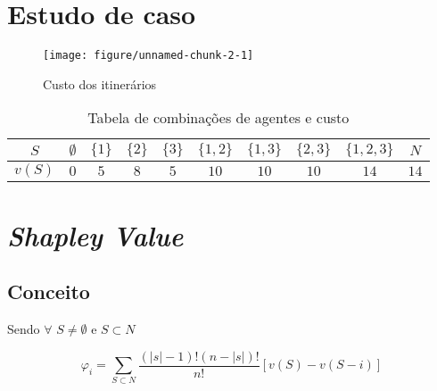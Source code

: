 \documentclass[
	article,			        %
	11pt,				          %
	oneside,			        %
	a4paper,			        %
	english,			        %
	brazil,				        %
	sumario=tradicional
]{abntex2}\usepackage[]{graphicx}\usepackage[]{color}
\makeatletter
\def\maxwidth{ %
  \ifdim\Gin@nat@width>\linewidth
    \linewidth
  \else
    \Gin@nat@width
  \fi
}
\newenvironment{knitrout}{}{} %
\makeatother
\begin{document}
\section{Estudo de caso}
\label{sec:caso}

\begin{knitrout}
\color{fgcolor}\begin{figure}[H]

{\centering \texttt{[image: figure/unnamed-chunk-2-1]} 

}

\caption[Custo dos itinerários]{Custo dos itinerários}\label{fig:unnamed-chunk-2}
\end{figure}


\end{knitrout}

\begin{table}[!h]
  \centering
  \caption{Tabela de combinações de agentes e custo}
  \label{Tab1}
  \begin{tabular}{@{}cccccccccc@{}}
  \toprule
    $S$    & $\emptyset$ & $\{1\}$ & $\{2\}$ & $\{3\}$ & $\{1,2\}$ & $\{1,3\}$ & $\{2,3\}$ &     $\{1,2,3\}$ & $N$  \\ \midrule
    $v(S)$ & $0$         & $5$     & $8$     & $5$     & $10$      & $10$      & $10$      &     $14$        & $14$ \\ \bottomrule
  \end{tabular}
\end{table}

\section{\emph{Shapley Value}}
\label{sec:teoria}

\subsection{Conceito}

Sendo $\forall$ $S \neq \emptyset$ e $S \subset N$

\begin{equation}
  \label{eq:shaVal}
  \varphi _{i} = \sum_{S \subset N} \frac{(|s| - 1)!(n - |s|)!}{n!}[v(S)-v(S - i)]
\end{equation}
\end{document}
